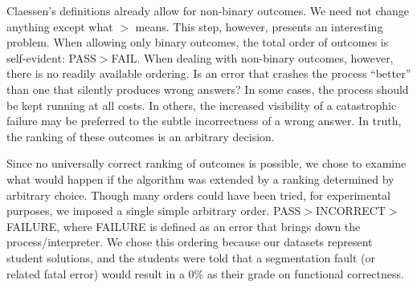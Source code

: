 \documentclass[11pt,twoside]{article}
\begin{document}
Claessen's definitions already allow for non-binary outcomes. We need not change anything except what $>$ means. This step, however, presents an interesting problem. When allowing only binary outcomes, the total order of outcomes is self-evident: PASS$>$FAIL. When dealing with non-binary outcomes, however, there is no readily available ordering. Is an error that crashes the process ``better'' than one that silently produces wrong answers? In some cases, the process should be kept running at all costs. In others, the increased visibility of a catastrophic failure may be preferred to the subtle incorrectness of a wrong answer. In truth, the ranking of these outcomes is an arbitrary decision.

Since no universally correct ranking of outcomes is possible, we chose to examine what would happen if the algorithm was extended by a ranking determined by arbitrary choice. Though many orders could have been tried, for experimental purposes, we imposed a single simple arbitrary order. PASS$>$INCORRECT$>$FAILURE, where FAILURE is defined as an error that brings down the process/interpreter. We chose this ordering because our datasets represent student solutions, and the students were told that a segmentation fault (or related fatal error) would result in a 0\% as their grade on functional correctness.
\end{document}

